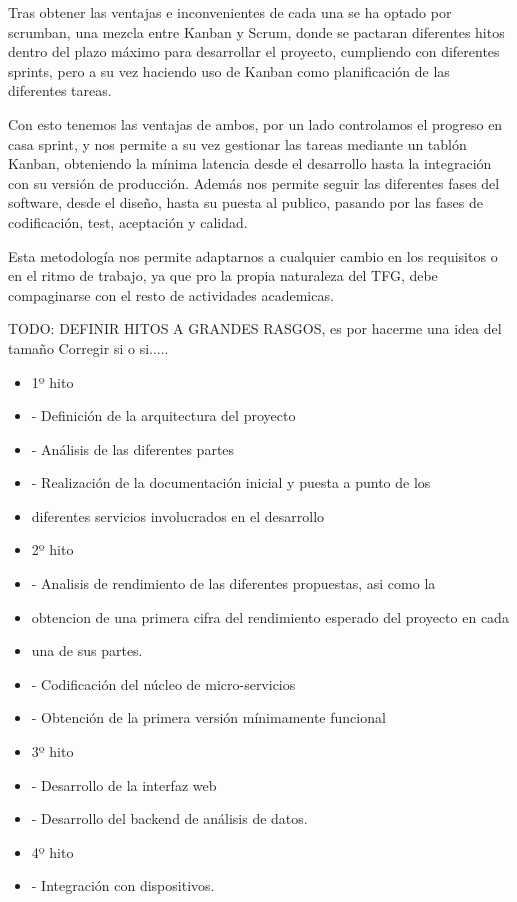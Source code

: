 \documentclass{pre-tfg}
\begin{document}
Tras obtener las ventajas e inconvenientes de cada una se ha optado por scrumban, una mezcla
entre Kanban y Scrum, donde se pactaran diferentes hitos dentro del
plazo máximo para desarrollar el proyecto, cumpliendo con diferentes
sprints, pero a su vez haciendo uso de Kanban como planificación de
las diferentes tareas.

Con esto tenemos las ventajas de ambos, por un lado controlamos el
progreso en casa sprint, y nos permite a su vez gestionar las tareas
mediante un tablón Kanban, obteniendo la mínima latencia desde el
desarrollo hasta la integración con su versión de producción. Además
nos permite seguir las diferentes fases del software, desde el diseño,
hasta su puesta al publico, pasando por las fases de codificación,
test, aceptación y calidad.

Esta metodología nos permite adaptarnos a cualquier cambio en los
requisitos o en el ritmo de trabajo, ya que pro la propia naturaleza
del TFG, debe compaginarse con el resto de actividades academicas.

TODO: DEFINIR HITOS A GRANDES RASGOS, es por hacerme una idea del tamaño Corregir si o si.....

\begin{itemize}
\item 1º hito
\item - Definición de la arquitectura del proyecto
\item - Análisis de las diferentes partes
\item - Realización de la documentación inicial y puesta a punto de los
\item diferentes servicios involucrados en el desarrollo
\item 2º hito
\item - Analisis de rendimiento de las diferentes propuestas, asi como la
\item obtencion de una primera cifra del rendimiento esperado del proyecto en cada
\item una de sus partes.
\item - Codificación del núcleo de micro-servicios
\item - Obtención de la primera versión mínimamente funcional
\item 3º hito
\item - Desarrollo de la interfaz web
\item - Desarrollo del backend de análisis de datos.
\item 4º hito
\item - Integración con dispositivos.
\end{itemize}
\clearpage
\end{document}
